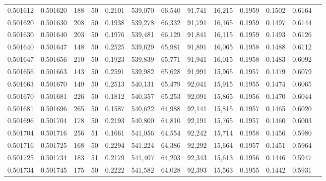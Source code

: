 \begin{tabular}{rrrrrrrrrrrrr}
0.501612 & 0.501620 & 188 &  50 &                                     0.2101 & 539,070 &  66,540 &  91,741 &  16,215 & 0.1959 & 0.1502 & 0.6164 \\
0.501620 & 0.501630 & 208 &  50 &                                     0.1938 & 539,278 &  66,332 &  91,791 &  16,165 & 0.1959 & 0.1497 & 0.6144 \\
0.501630 & 0.501640 & 203 &  50 &                                     0.1976 & 539,481 &  66,129 &  91,841 &  16,115 & 0.1959 & 0.1493 & 0.6126 \\
0.501640 & 0.501647 & 148 &  50 &                                     0.2525 & 539,629 &  65,981 &  91,891 &  16,065 & 0.1958 & 0.1488 & 0.6112 \\
0.501647 & 0.501656 & 210 &  50 &                                     0.1923 & 539,839 &  65,771 &  91,941 &  16,015 & 0.1958 & 0.1483 & 0.6092 \\
0.501656 & 0.501663 & 143 &  50 &                                     0.2591 & 539,982 &  65,628 &  91,991 &  15,965 & 0.1957 & 0.1479 & 0.6079 \\
0.501663 & 0.501670 & 149 &  50 &                                     0.2513 & 540,131 &  65,479 &  92,041 &  15,915 & 0.1955 & 0.1474 & 0.6065 \\
0.501670 & 0.501681 & 226 &  50 &                                     0.1812 & 540,357 &  65,253 &  92,091 &  15,865 & 0.1956 & 0.1470 & 0.6044 \\
0.501681 & 0.501696 & 265 &  50 &                                     0.1587 & 540,622 &  64,988 &  92,141 &  15,815 & 0.1957 & 0.1465 & 0.6020 \\
0.501696 & 0.501704 & 178 &  50 &                                     0.2193 & 540,800 &  64,810 &  92,191 &  15,765 & 0.1957 & 0.1460 & 0.6003 \\
0.501704 & 0.501716 & 256 &  51 &                                     0.1661 & 541,056 &  64,554 &  92,242 &  15,714 & 0.1958 & 0.1456 & 0.5980 \\
0.501716 & 0.501725 & 168 &  50 &                                     0.2294 & 541,224 &  64,386 &  92,292 &  15,664 & 0.1957 & 0.1451 & 0.5964 \\
0.501725 & 0.501734 & 183 &  51 &                                     0.2179 & 541,407 &  64,203 &  92,343 &  15,613 & 0.1956 & 0.1446 & 0.5947 \\
0.501734 & 0.501745 & 175 &  50 &                                     0.2222 & 541,582 &  64,028 &  92,393 &  15,563 & 0.1955 & 0.1442 & 0.5931 \\

\end{tabular}
